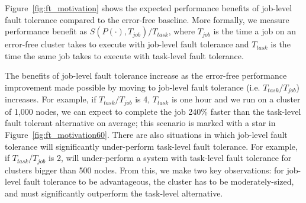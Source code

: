 Figure~\ref{fig:ft_motivation} shows the expected performance benefits of
job-level fault tolerance compared to the error-free baseline.  More formally,
we measure performance benefit as $S(P(\cdot),T_{job}) / T_{task}$,
where $T_{job}$ is the time a job on an error-free cluster takes to execute
with job-level fault tolerance and $T_{task}$ is the time the same job takes to
execute with task-level fault tolerance.

The benefits of job-level fault tolerance increase as the error-free
performance improvement made possible by moving to job-level fault tolerance
(i.e. $T_{task} / T_{job}$) increases. For example, if $T_{task} / T_{job}$ is
4, $T_{task}$ is one hour and we run on a cluster of 1,000 nodes, we can expect
\themis to complete the job 240\% faster than the task-level fault tolerant
alternative on average; this scenario is marked with a star in
Figure~\ref{fig:ft_motivation60}.  There are also situations in which
job-level fault tolerance will significantly under-perform task-level fault
tolerance.  For example, if $T_{task} / T_{job}$ is 2, \themis will
under-perform a system with task-level fault tolerance for clusters bigger than
500 nodes.  From this, we make two key observations: for job-level fault
tolerance to be advantageous, the cluster has to be moderately-sized, and
\themis must significantly outperform the task-level alternative.

